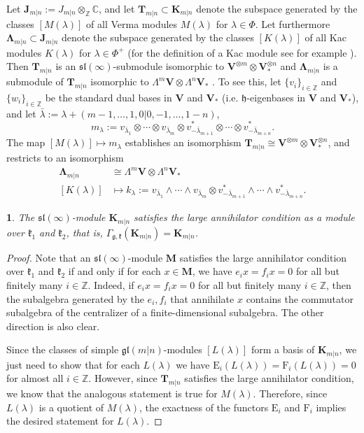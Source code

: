 \documentclass[12pt,oneside,english]{amsart}
\numberwithin{equation}{section}
\numberwithin{figure}{section}
\theoremstyle{plain}
\theoremstyle{plain}
\newtheorem{lem}[thm]{\protect\lemmaname}
\theoremstyle{remark}
\theoremstyle{definition}
\theoremstyle{plain}
\theoremstyle{remark}
\theoremstyle{definition}
\theoremstyle{plain}
\theoremstyle{plain}
\theoremstyle{definition}
\providecommand{\lemmaname}{Lemma}
\newcommand{\bT}{\mathbf{T}}
\newcommand{\bV}{\mathbf{V}}
\newcommand{\bK}{\mathbf{K}}
\newcommand{\bJ}{\mathbf{J}}
\newcommand{\bM}{\mathbf{M}}
\newcommand{\bW}{\mathbf{\Lambda}}
\newcommand{\fg}{\mathfrak{g}}
\newcommand{\fk}{\mathfrak{k}}
\begin{document}
Let  $\bJ_{m|n}:= J_{m|n}\otimes_{\mathbb Z}\mathbb C$, and let $\bT_{m|n}\subset \bK_{m|n}$ denote the subspace generated by the classes $[M(\lambda)]$ of all Verma modules $M(\lambda)$ for $\lambda\in\Phi$. Let furthermore $\bW_{m|n}\subset\bJ_{m|n}$ denote the subspace generated by the classes $[K(\lambda)]$ of all Kac modules $K(\lambda)$ for $\lambda\in\Phi^+$  (for the definition of a Kac module see for example \cite{B}).
Then $\bT_{m|n}$ is an  $\mathfrak{sl}\left(\infty\right)$-submodule isomorphic to $\bV^{\otimes m}\otimes \bV^{\otimes n}_*$ and $\bW_{m|n}$ is a submodule of $\bT_{m|n}$ isomorphic to $\Lambda^{m}\bV\otimes\Lambda^{n}\bV_*$ \cite{B}. To see this, let $\{v_i\}_{i\in\mathbb Z}$
and $\{w_i\}_{i\in\mathbb Z}$ be the standard dual bases in $\bV$ and $\bV_*$ (i.e. $\mathfrak h$-eigenbases in $\bV$ and $\bV_*$), and let $\bar\lambda:=\lambda+(m-1,\dots,1,0|0,-1,\dots,1-n)$,
$$m_\lambda:=v_{\bar\lambda_1}\otimes \cdots\otimes v_{\bar\lambda_m}\otimes v^*_{-\bar\lambda_{m+1}}\otimes\cdots\otimes v^*_{-\bar\lambda_{m+n}}.$$
The map $[M(\lambda)]\mapsto m_{\lambda}$ establishes an isomorphism $\bT_{m|n}\cong \bV^{\otimes m}\otimes \bV^{\otimes n}_*$, and
restricts to an isomorphism \begin{align*}\bW_{m|n}&\cong \Lambda^{m}\bV\otimes\Lambda^{n}\bV_{*}\\
 [K(\lambda)]&\mapsto k_{\lambda}:=v_{\bar\lambda_1}\wedge \cdots\wedge v_{\bar\lambda_m}\otimes v^*_{-\bar\lambda_{m+1}}\wedge\cdots\wedge v^*_{-\bar\lambda_{m+n}}.\end{align*}









\begin{lem}\label{lem-annihilator} The $\mathfrak{sl}(\infty)$-module $\bK_{m|n}$  satisfies the large annihilator condition as a module over $\fk_1$ and $\fk_2$, that is,  $\Gamma_{\fg,\fk}(\bK_{m|n})=\bK_{m|n}$.
\end{lem}
\begin{proof}
Note that an $\mathfrak{sl}(\infty)$-module $\bM$ satisfies the large annihilator condition over $\fk_1$ and $\fk_2$ if and only if for each $x\in\bM$, we have $e_i x=f_i x=0$ for all but finitely many $i\in\mathbb{Z}$.
Indeed, if  $e_i x=f_i x=0$ for all but finitely many $i\in\mathbb{Z}$, then the subalgebra generated by the $e_i,f_i$ that annihilate $x$ contains the commutator subalgebra of the centralizer of a finite-dimensional subalgebra. The other direction is also clear.

Since the classes of simple $\mathfrak{gl}(m|n)$-modules $[L(\lambda)]$ form a basis of $\bK_{m|n}$, we just need to show that  for each $L(\lambda)$ we have $\mathrm{E}_i(L(\lambda))=\mathrm{F}_i(L(\lambda))= 0$
for almost all $i\in\mathbb Z$. However, since $\bT_{m|n}$ satisfies the large annihilator condition, we know that the analogous statement is true for $M(\lambda)$. Therefore, since $L(\lambda)$ is a quotient of $M(\lambda)$, the exactness of the functors $\mathrm{E}_i$ and $\mathrm{F}_i$ implies the desired statement for $L(\lambda)$.
\end{proof}
\end{document}
